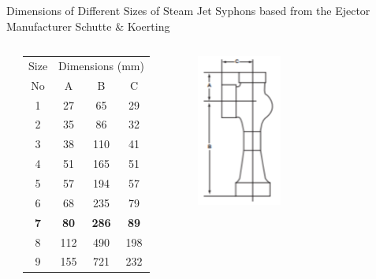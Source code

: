 \begin{frame}{Dimensions of Different Sizes of Steam Jet Syphons based from the Ejector Manufacturer Schutte \& Koerting\cite{SchutteandKoerting}}
\begin{columns}
       \begin{table}[h]
       \label{tab:SteamJetSyphons_sizes}
       \begin{tabular}{|c|c|c|c|}
        \hline
        Size & \multicolumn{3}{c|}{Dimensions (mm)}  \\
        \cline{2-4}
        No & A & B & C \\
        \hline
        1 & 27 & 65 & 29 \\
        \hline
        2 & 35 & 86 & 32 \\
        \hline
        3 & 38 & 110 & 41 \\
        \hline
        4 & 51 & 165 & 51 \\
       \hline
        5 & 57 & 194 & 57 \\
       \hline
        6 & 68 & 235 & 79 \\
       \hline
        \textbf{7} & \textbf{80} & \textbf{286} & \textbf{89} \\
        \hline
        8 & 112 & 490 & 198 \\
        \hline
        9 & 155 & 721 & 232 \\
        \hline
        \end{tabular}
       \end{table}
    \begin{figure}[h]
    \centering
    \includegraphics[height=5cm]{images/Syphonsshcutteandkoerting.PNG}
    \end{figure}
  \end{columns}
\end{frame}

